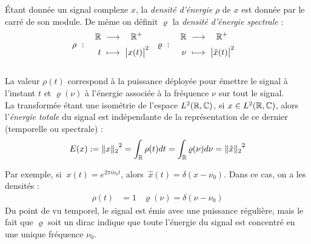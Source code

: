 \begin{definition}\label{def:densite_dE}
	Étant donnée un signal complexe $x$, la \emph{densité d'énergie} $\rho$ de $x$ est donnée par le carré de son module. De même on définit $\varrho$ la \emph{densité d'énergie spectrale} :
	\begin{align*}
		\rho\ &:\quad \begin{aligned}\R\ &\lr\quad \R^+ \\ t\ &\longmapsto\ \big|x(t)\big|^2 \end{aligned}  &
		\varrho\ &:\quad \begin{aligned}\R\ &\lr\quad \R^+ \\ \nu\ &\longmapsto\ \big|\hat{x}(t)\big|^2 \end{aligned}
	\end{align*}
	\\
	La valeur $\rho(t)$ correspond à la puissance déployée pour émettre le signal à l'instant $t$ et $\varrho(\nu)$ à l'énergie associée à la fréquence $\nu$ sur tout le signal. 
	\\
	La transformée étant une isométrie de l'espace $L^2(\mathbb{R},\mathbb{C})$, si $x\in L^2(\mathbb{R},\mathbb{C})$, alors l'\emph{énergie totale} du signal est indépendante de la représentation de ce dernier (temporelle ou spectrale) :
	\begin{equation}\label{eq:parceval}
		E(x) := {\|x\|_2}^2 = \int_{\mathbb{R}} \rho(t) dt = \int_{\mathbb{R}} \varrho(\nu) d\nu = {\|\hat{x}\|_2}^2
	\end{equation}
\end{definition}

Par exemple, si $\ x(t)=e^{2\pi i\nu_0 t}$, alors $\ \hat{x}(t) = \delta(x-\nu_0)$. Dans ce cas, on a les densités :
\begin{align*}
	\rho(t) &= 1  &  \varrho(\nu) = \delta(\nu-\nu_0)
\end{align*}
Du point de vu temporel, le signal est émis avec une puissance régulière, mais le fait que $\varrho$ soit un dirac indique que toute l'énergie du signal est concentré en une unique fréquence $\nu_0$.
\\ \\

